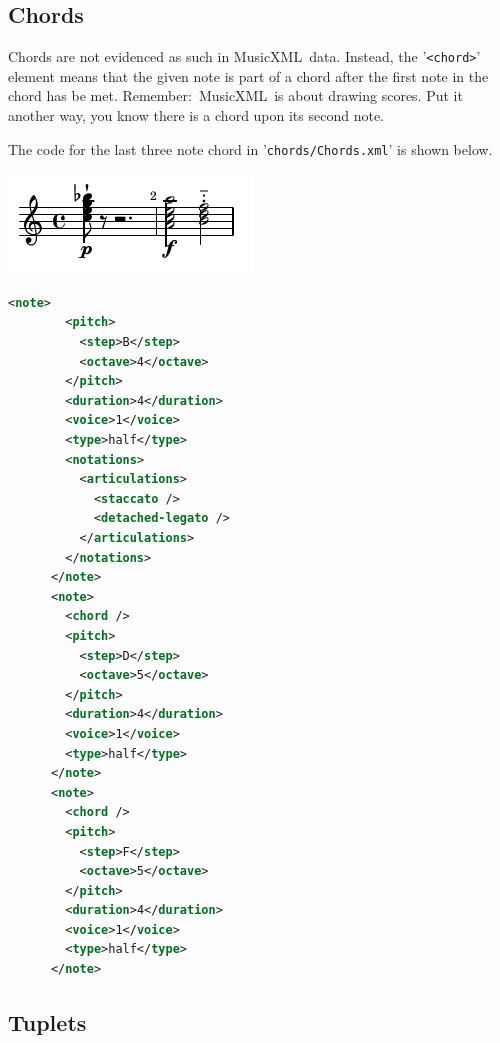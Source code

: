 \documentclass[12pt,a4paper]{article}
\newcommand{\mxml}{MusicXML}
\begin{document}
\subsection{Chords}

Chords are not evidenced as such in \mxml\ data. Instead, the {'\tt <chord>}' element means that the given note is part of a chord after the first note in the chord has be met. Remember:~\mxml\ is about drawing scores. Put it another way, you know there is a chord upon its second note.

The code for the last three note chord in {'\tt chords/Chords.xml}' is shown below.

\includegraphics{Chords.png}

\begin{lstlisting}[language=XML, caption=Chord example]
      <note>
        <pitch>
          <step>B</step>
          <octave>4</octave>
        </pitch>
        <duration>4</duration>
        <voice>1</voice>
        <type>half</type>
        <notations>
          <articulations>
            <staccato />
            <detached-legato />
          </articulations>
        </notations>
      </note>
      <note>
        <chord />
        <pitch>
          <step>D</step>
          <octave>5</octave>
        </pitch>
        <duration>4</duration>
        <voice>1</voice>
        <type>half</type>
      </note>
      <note>
        <chord />
        <pitch>
          <step>F</step>
          <octave>5</octave>
        </pitch>
        <duration>4</duration>
        <voice>1</voice>
        <type>half</type>
      </note>
\end{lstlisting}

\subsection{Tuplets}\label{tuplets}
\end{document}
